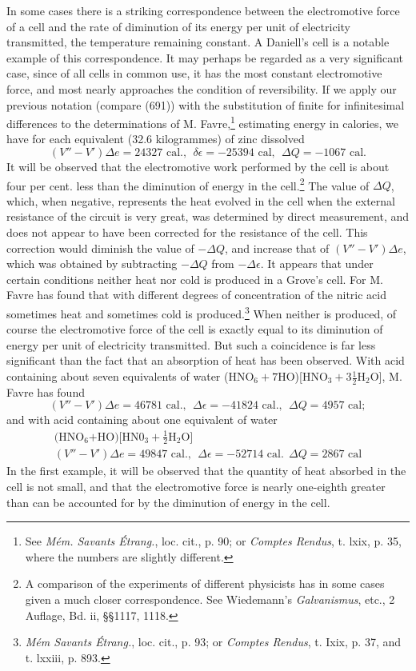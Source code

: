 \documentclass[12pt]{article}
\begin{document}
In some cases there is a striking correspondence between the electromotive force of a cell and the rate of diminution of its energy per unit of electricity transmitted, the temperature remaining constant. A Daniell's cell is a notable example of this correspondence. It may perhaps be regarded as a very significant case, since of all cells in common use, it has the most constant electromotive force, and most nearly approaches the condition of reversibility. If we apply our previous notation (compare (691)) with the substitution of finite for infinitesimal differences to the determinations of M. Favre,\footnote{See \textit{M\'{e}m. Savants \'{E}trang.}, loc. cit., p. 90; or \textit{Comptes Rendus}, t. lxix, p. 35, where the numbers are slightly different.} estimating energy in calories, we have for each equivalent (32.6 kilogrammes) of zinc dissolved
$$(V''- V') \Delta e= 24327 \text{ cal}., \ \  \delta \epsilon = - 25394\text{ cal}, \ \  \Delta Q= - 1067 \text{ cal}.$$
It will be observed that the electromotive work performed by the cell is about four per cent. less than the diminution of energy in the cell.\footnote{A comparison of the experiments of different physicists has in some cases given a much closer correspondence. See Wiedemann's \textit{Galvanismus}, etc., 2 Auflage, Bd. ii, \S\S 1117, 1118.} The value of $\Delta Q$, which, when negative, represents the heat evolved in the cell when the external resistance of the circuit is very great, was determined by direct measurement, and does not appear to have been corrected for the resistance of the cell. This correction would diminish the value of $-\Delta Q$, and increase that of $(V'' - V')\Delta e$, which was obtained by subtracting $-\Delta Q$ from $- \Delta \epsilon$.
It appears that under certain conditions neither heat nor cold is produced in a Grove's cell. For M. Favre has found that with different degrees of concentration of the nitric acid sometimes heat and sometimes cold is produced.\footnote{\textit{M\'{e}m Savants \'{E}trang.}, loc. cit., p. 93; or \textit{Comptes Rendus}, t. Ixix, p. 37, and t. lxxiii, p. 893.} When neither is produced, of course the electromotive force of the cell is exactly equal to its diminution of energy per unit of electricity transmitted. But such a coincidence is far less significant than the fact that an absorption of heat has been observed. With acid containing about seven equivalents of water (HNO$_6+7$HO)[HNO$_3+3\tfrac{1}{2}$H$_2$O], M. Favre has found
$$ (V''- V')\Delta e=46781 \text{ cal.},\ \  \Delta \epsilon=  -41824 \text{ cal.}, \ \ \Delta Q=4957\text{ cal};$$
and with acid containing about one equivalent of water
\begin{gather*}\text{(HNO$_6$+HO)[HN0$_3+\tfrac{1}{2}$H$_2$O]}\\
(V''- V')\Delta e=49847 \text{ cal.},\ \  \Delta \epsilon=  -52714 \text{ cal.} \ \ \Delta Q=2867\text{ cal} \end{gather*}
In the first example, it will be observed that the quantity of heat absorbed in the cell is not small, and that the electromotive force is nearly one-eighth greater than can be accounted for by the diminution of energy in the cell.
\end{document}

